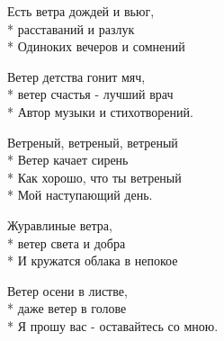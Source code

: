 \medskip

\begin{minipage}{\linewidth}
Есть ветра дождей и вьюг,\\*
расставаний и разлук\\*
Одиноких вечеров и сомнений\\
\end{minipage}\par\medskip\nobreak

\medskip

\begin{minipage}{\linewidth}
Ветер детства гонит мяч,\\*
ветер счастья - лучший врач\\*
Автор музыки и стихотворений.\\
\end{minipage}\par\medskip\nobreak

\medskip

\begin{minipage}{\linewidth}
\hspace*{1.5em}Ветреный, ветреный, ветреный\\*
\hspace*{1.5em}Ветер качает сирень\\*
\hspace*{1.5em}Как хорошо, что ты ветреный\\*
\hspace*{1.5em}Мой наступающий день.\\
\end{minipage}\par\medskip\nobreak

\medskip

\begin{minipage}{\linewidth}
Журавлиные ветра,\\*
ветер света и добра\\*
И кружатся облака в непокое\\
\end{minipage}\par\medskip\nobreak

\medskip

\begin{minipage}{\linewidth}
Ветер осени в листве,\\*
даже ветер в голове\\*
Я прошу вас - оставайтесь со мною.\\
\end{minipage}\par\medskip\nobreak

